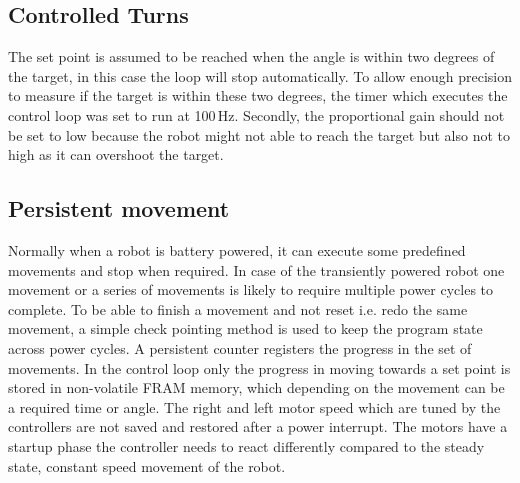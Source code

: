 \subsection{Controlled Turns}
The set point is assumed to be reached when the angle is within two degrees of the target, in this case the loop will stop automatically.
To allow enough precision to measure if the target is within these two degrees, the timer which executes the control loop was set to run at 100\,Hz.
Secondly, the proportional gain should not be set to low because the robot might not able to reach the target but also not to high as it can overshoot the target.


\subsection{Persistent movement}

Normally when a robot is battery powered, it can execute some predefined movements and stop when required.
In case of the transiently powered robot one movement or a series of movements is likely to require multiple power cycles to complete.
To be able to finish a movement and not reset i.e. redo the same movement, a simple check pointing method is used to keep the program state across power cycles.
A persistent counter registers the progress in the set of movements.
In the control loop only the progress in moving towards a set point is stored in non-volatile FRAM memory, which depending on the movement can be a required time or angle.
The right and left motor speed which are tuned by the controllers are not saved and restored after a power interrupt.
The motors have a startup phase the controller needs to react differently compared to the steady state, constant speed movement of the robot. 